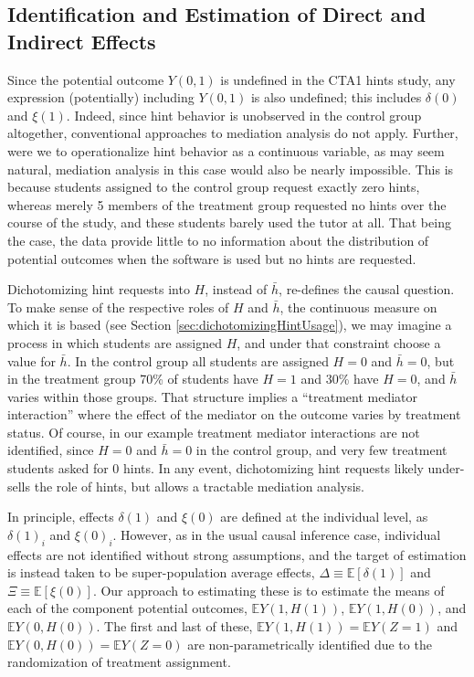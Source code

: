 \documentclass{article}\usepackage[]{graphicx}\usepackage[]{color}
\newcommand{\EE}{\mathbb{E}}
\begin{document}
\subsection{Identification and Estimation of Direct and Indirect
  Effects}

Since the potential outcome $Y(0,1)$ is undefined in the CTA1 hints
study, any expression (potentially) including $Y(0,1)$ is also
undefined; this includes $\delta(0)$ and $\xi(1)$.
Indeed, since hint behavior is unobserved in the control group
altogether, conventional approaches to mediation analysis do not
apply.
Further, were we to operationalize hint behavior as a continuous
variable, as may seem natural, mediation analysis in this case would
also be nearly impossible.
This is because students assigned to the control group request exactly
zero hints, whereas merely
5
members of the treatment group
requested no hints over the course of the study, and these students
barely used the tutor at all.
That being the case, the data provide little to no information about
the distribution of potential outcomes when the software is used
but no hints are requested.

Dichotomizing hint requests into $H$, instead of $\bar{h}$, re-defines
the causal question.
To make sense of the respective roles of $H$ and $\bar{h}$, the
continuous measure on which it is based (see Section
\ref{sec:dichotomizingHintUsage}),
we may imagine a process in
which students are assigned $H$, and under that constraint choose a
value for $\bar{h}$.
In the control group all students are assigned $H=0$ and $\bar{h}=0$, but
in the treatment group 70\% of students have $H=1$ and 30\% have
$H=0$, and $\bar{h}$ varies within those groups.
That structure implies a ``treatment mediator interaction''
where the effect of the mediator on the outcome varies by treatment
status.
Of course, in our example treatment mediator interactions are not
identified, since $H=0$ and $\bar{h}=0$ in the control group, and very
few treatment students asked for 0 hints.
In any event, dichotomizing hint requests likely under-sells the role
of hints, but allows a tractable mediation analysis.

In principle, effects $\delta(1)$ and $\xi(0)$ are defined at the
individual level, as $\delta(1)_i$ and $\xi(0)_i$.
However, as in the usual causal inference case, individual effects are
not identified without strong assumptions, and the target of
estimation is instead taken to be super-population average effects,
$\Delta\equiv\EE[\delta(1)]$ and $\Xi\equiv\EE[\xi(0)]$. Our approach to estimating these
is to estimate the means of each of the component potential outcomes,
$\EE Y(1,H(1))$, $\EE Y(1,H(0))$, and $\EE Y(0,H(0))$.
The first and last of these, $\EE Y(1,H(1))=\EE Y(Z=1)$ and $\EE
Y(0,H(0))=\EE Y(Z=0)$ are non-parametrically identified due to the
randomization of treatment assignment.
\end{document}

